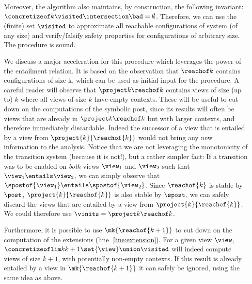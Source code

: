 Moreover, the algorithm also maintains, by construction, the following invariant:
$\concretizeof k \visited \intersection \bad = \emptyset$.
%
Therefore, we can use the (finite) set $\visited$ to approximate all
reachable configurations of system (of any size) and verify/falsify
safety properties for configurations of arbitrary size. 
%
The procedure is sound.
%
%
%

We discuss a major acceleration for this procedure which leverages the
power of the entailment relation. %
It is based on the observation that $\reachof k$ contains
configurations of size k, which can be used as initial input for the
procedure. 
%
A careful reader will observe that $\project k {\reachof k}$ contains
views of size (up to) $k$ where all views of size $k$ have empty
contexts. These will be useful to cut down on the computations of the
symbolic post, %
since its results will often be views that are already in $\project k
{\reachof k}$ but with larger contexts, and therefore immediately
discardable.
%
Indeed the successor of a view that is entailed by a view from
$\project{k} {\reachof {k}}$ would not bring any new information to
the analysis. Notice that we are not leveraging the monotonicity of
the transition system (because it is not!), but a rather simpler fact:
If a transition was to be enabled on \emph{both} views $\view_1$ and
$\view_2$ such that $\view_1\entails\view_2$, we can simply observe
that $\spostof{\view_1}\entails\spostof{\view_2}$. %
Since $\reachof {k}$ is stable by $\post$, $\project{k} {\reachof
  {k}}$ is also stable by $\spost$, we can safely discard the views
that are entailed by a view from $\project{k} {\reachof {k}}$. %
We could therefore use $\vinits = \project k {\reachof k}$.

Furthermore, it is possible to use %
$\mk{\reachof {k+1}}$ %
to cut down on the computation of the extensions
(line~\ref{line:extension}). For a given view $\view$,
$\concretizeoflim k {k+1} {\set{\view} \union \visited}$ will indeed
compute views of size $k+1$, with potentially non-empty contexts. If
this result is already entailed by a view in %
$\mk{\reachof {k+1}}$ %
it can safely be ignored, using the same idea as above.

